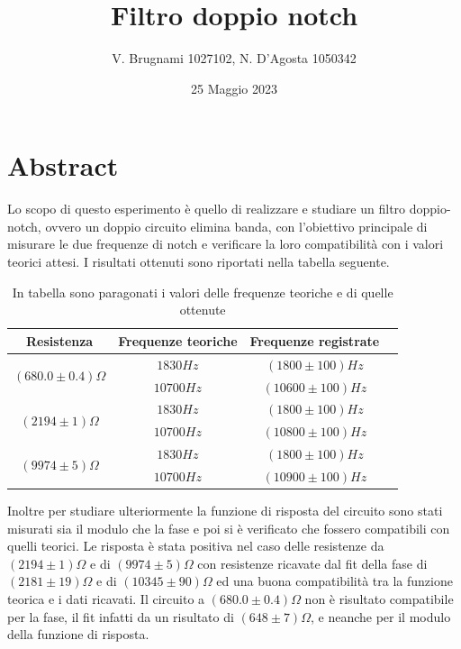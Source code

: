 \documentclass[leqno]{article}
\begin{document}
	
	
	
	\title{Filtro doppio notch}
	\author{V. Brugnami 1027102, N. D'Agosta 1050342}
	\date{ 25 Maggio 2023}
	\maketitle
	
	\section{Abstract}
	Lo scopo di questo esperimento è quello di realizzare e studiare un filtro doppio-notch, ovvero un doppio circuito elimina banda, con l'obiettivo principale di misurare le due frequenze di notch e verificare la loro compatibilità con i valori teorici attesi. I risultati ottenuti sono riportati nella tabella seguente.
	
	\begin{table}[h]
		\begin{center}
			\begin{tabular}{ |c|c|c|c| } 
				\hline
				\textbf{Resistenza} & \textbf{Frequenze teoriche} & \textbf{Frequenze registrate} \\
				\hline
				\multirow{2}{6em}{$(680.0\pm0.4) \Omega$} & $1830Hz$ & $(1800\pm100) Hz$ \\ 
				\cline{2-3}
				& $10700Hz$ & $(10600\pm100)Hz$ \\ 
				\hline
				\multirow{2}{6em}{$(2194\pm1) \Omega$} & $1830Hz$ & $(1800\pm100)Hz$ \\ 
				\cline{2-3}
				& $10700Hz$ & $(10800\pm100)Hz$ \\ 
				\hline
				\multirow{2}{6em}{$(9974\pm5) \Omega$} & $1830Hz$ & $(1800\pm100)Hz$ \\ 
				\cline{2-3}
				& $10700Hz$ & $(10900\pm100)Hz$ \\ 
				\hline
			\end{tabular}
		\end{center}
		\caption{In tabella sono paragonati i valori delle frequenze teoriche e di quelle ottenute}
		\label{Tab intro}
	\end{table}
	
	Inoltre per studiare ulteriormente la funzione di risposta del circuito sono stati misurati sia il modulo che la fase e poi si è verificato che fossero compatibili con quelli teorici. Le risposta è stata positiva nel caso delle resistenze da $(2194\pm1) \Omega$ e di $(9974\pm5) \Omega$  con resistenze ricavate dal fit della fase di $(2181   \pm   19) \Omega$ e di $( 10345   \pm   90) \Omega$ ed una buona compatibilità tra la funzione teorica e i dati ricavati. Il circuito a $(680.0\pm0.4) \Omega$  non è risultato compatibile per la fase, il fit infatti da un risultato di $(648  \pm   7) \Omega$, e neanche per il modulo della funzione di risposta. 
	
\end{document}
